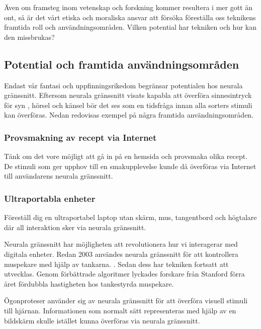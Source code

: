 \documentclass[12pt, a4paper]{article}
\begin{document}
Även om framsteg inom vetenskap och forskning kommer resultera i mer gott än
ont, så är det vårt etiska och moraliska ansvar att försöka föreställa oss
teknikens framtida roll och användningsområden. Vilken potential har tekniken
och hur kan den missbrukas?


\subsection{Potential och framtida användningsområden}

Endast vår fantasi och uppfinningsrikedom begränsar potentialen hos neurala
gränssnitt. Eftersom neurala gränssnitt visats kapabla att överföra
sinnesintryck för syn \cite{sight1,sight2}, hörsel \cite{sound} och känsel
\cite{touch} bör det ses som en tidsfråga innan alla sorters stimuli kan
överföras. Nedan redovisas exempel på några framtida användningsområden.

\subsubsection{Provsmakning av recept via Internet}

Tänk om det vore möjligt att gå in på en hemsida och provsmaka olika recept. De
stimuli som ger upphov till en smakupplevelse kunde då överföras via Internet
till användarens neurala gränssnitt.

\subsubsection{Ultraportabla enheter}

Föreställ dig en ultraportabel laptop utan skärm, mus, tangentbord och högtalare
där all interaktion sker via neurala gränssnitt.

Neurala gränssnitt har möjligheten att revolutionera hur vi interagerar med
digitala enheter. Redan 2003 användes neurala gränssnitt för att kontrollera
muspekare med hjälp av tankarna. \cite{cursor1}. Sedan dess har tekniken
fortsatt att utvecklas. Genom förbättrade algoritmer lyckades forskare från
Stanford förra året fördubbla hastigheten hos tankestyrda muspekare.
\cite{fast_cursor}

Ögonproteser använder sig av neurala gränssnitt för att överföra visuell stimuli
till hjärnan. \cite{prosthetic_operation} Informationen som normalt sätt
representeras med hjälp av en bildskärm skulle istället kunna överföras via
neurala gränssnitt.
\end{document}
